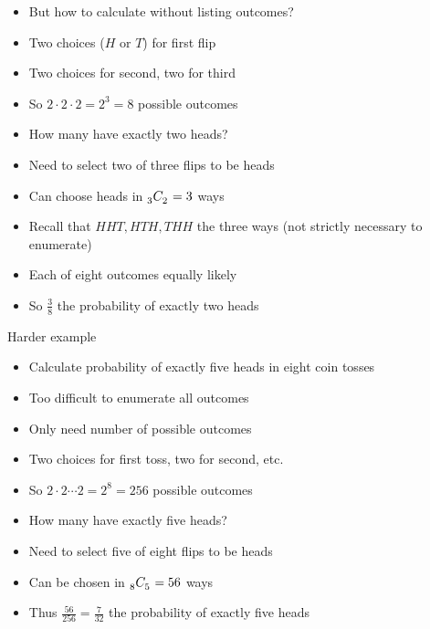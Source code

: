 \documentclass[xcolor=dvipsnames]{beamer}
\theoremstyle{definition}
\newcommand\ncr[2]{\tensor[_{#1}]C{_{#2}}}
\begin{document}
\begin{frame}
\begin{itemize}
\item But how to calculate without listing outcomes?
\item Two choices ($H$ or $T$) for first flip
\item Two choices for second, two for third
\item So $2\cdot 2\cdot 2=2^3=8$ possible outcomes
\item How many have exactly two heads?
\item Need to select two of three flips to be heads
\item Can choose heads in $\ncr{3}{2}=3$ ways
\item Recall that $HHT,HTH,THH$ the three ways
(not strictly necessary to enumerate)
\item Each of eight outcomes equally likely
\item So $\frac{3}{8}$ the probability of exactly two heads
\end{itemize}
\end{frame}

\begin{frame}{Harder example}
\begin{itemize}
\item Calculate probability of exactly five heads in eight coin tosses
\item Too difficult to enumerate all outcomes
\item Only need \alert{number} of possible outcomes
\item Two choices for first toss, two for second, etc.
\item So $2\cdot 2\cdots 2=2^8=256$ possible outcomes
\item How many have exactly five heads?
\item Need to select five of eight flips to be heads
\item Can be chosen in $\ncr{8}{5}=56$ ways
\item Thus $\frac{56}{256}=\frac{7}{32}$ the probability
of exactly five heads
\end{itemize}
\end{frame}
\end{document}

